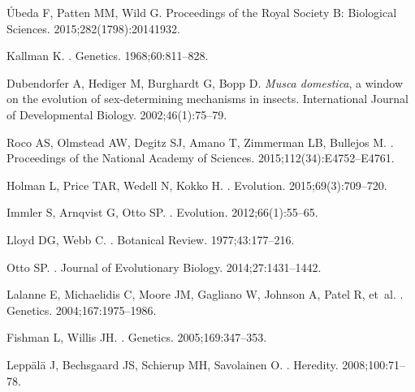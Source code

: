 \documentclass[10pt,letterpaper]{article}
\begin{document}
\begin{thebibliography}{100}
{\'U}beda F, Patten MM, Wild G.
\newblock Proceedings of the Royal Society B: Biological Sciences.
  2015;282(1798):20141932.

Kallman K.
.
\newblock Genetics. 1968;60:811--828.

Dubendorfer A, Hediger M, Burghardt G, Bopp D.
\newblock \textit{Musca domestica}, a window on the evolution of sex-determining
  mechanisms in insects.
\newblock International Journal of Developmental Biology. 2002;46(1):75--79.

Roco AS, Olmstead AW, Degitz SJ, Amano T, Zimmerman LB, Bullejos M.
.
\newblock Proceedings of the National Academy of Sciences.
  2015;112(34):E4752--E4761.

Holman L, Price TAR, Wedell N, Kokko H.
.
\newblock Evolution. 2015;69(3):709--720.

Immler S, Arnqvist G, Otto SP.
.
\newblock Evolution. 2012;66(1):55--65.

Lloyd DG, Webb C.
.
\newblock Botanical Review. 1977;43:177--216.

Otto SP.
.
\newblock Journal of Evolutionary Biology. 2014;27:1431--1442.

Lalanne E, Michaelidis C, Moore JM, Gagliano W, Johnson A, Patel R, et~al.
.
\newblock Genetics. 2004;167:1975--1986.

Fishman L, Willis JH.
.
\newblock Genetics. 2005;169:347--353.

Lepp{\"a}l{\"a} J, Bechsgaard JS, Schierup MH, Savolainen O.
.
\newblock Heredity. 2008;100:71--78.


\end{thebibliography}
\end{document}
